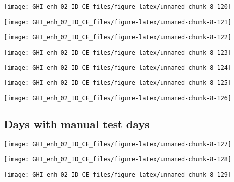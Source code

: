 \documentclass[
  10pt,
  a4paper,oneside]{article}
\begin{document}
\begin{center}\texttt{[image: GHI\_enh\_02\_ID\_CE\_files/figure-latex/unnamed-chunk-8-120]} \end{center}

\begin{center}\texttt{[image: GHI\_enh\_02\_ID\_CE\_files/figure-latex/unnamed-chunk-8-121]} \end{center}

\begin{center}\texttt{[image: GHI\_enh\_02\_ID\_CE\_files/figure-latex/unnamed-chunk-8-122]} \end{center}

\begin{center}\texttt{[image: GHI\_enh\_02\_ID\_CE\_files/figure-latex/unnamed-chunk-8-123]} \end{center}

\begin{center}\texttt{[image: GHI\_enh\_02\_ID\_CE\_files/figure-latex/unnamed-chunk-8-124]} \end{center}

\begin{center}\texttt{[image: GHI\_enh\_02\_ID\_CE\_files/figure-latex/unnamed-chunk-8-125]} \end{center}

\begin{center}\texttt{[image: GHI\_enh\_02\_ID\_CE\_files/figure-latex/unnamed-chunk-8-126]} \end{center}

\FloatBarrier

\hypertarget{days-with-manual-test-days}{%
\subsection{Days with manual test days}\label{days-with-manual-test-days}}

\begin{center}\texttt{[image: GHI\_enh\_02\_ID\_CE\_files/figure-latex/unnamed-chunk-8-127]} \end{center}

\begin{center}\texttt{[image: GHI\_enh\_02\_ID\_CE\_files/figure-latex/unnamed-chunk-8-128]} \end{center}

\begin{center}\texttt{[image: GHI\_enh\_02\_ID\_CE\_files/figure-latex/unnamed-chunk-8-129]} \end{center}
\end{document}
